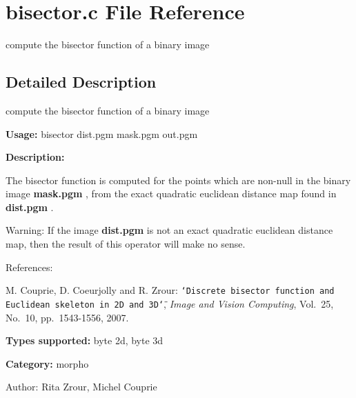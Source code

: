 \section{bisector.c File Reference}
\label{bisector_8c}
compute the bisector function of a binary image  




\label{_details}
\subsection{Detailed Description}
compute the bisector function of a binary image 

{\bf Usage:} bisector dist.pgm mask.pgm out.pgm

{\bf Description:}

The bisector function is computed for the points which are non-null in the binary image {\bf mask.pgm} , from the exact quadratic euclidean distance map found in {\bf dist.pgm} .

\begin{Desc}
\item[Warning:]If the image {\bf dist.pgm} is not an exact quadratic euclidean distance map, then the result of this operator will make no sense.\end{Desc}
References:\par
 [CCZ07] M. Couprie, D. Coeurjolly and R. Zrour: {\tt \char`\"{}Discrete bisector function and Euclidean skeleton in 2D and 3D\char`\"{}}, {\em Image and Vision Computing\/}, Vol.~25, No.~10, pp.~1543-1556, 2007.\par


{\bf Types supported:} byte 2d, byte 3d

{\bf Category:} morpho

\begin{Desc}
\item[Author:]Rita Zrour, Michel Couprie \end{Desc}

